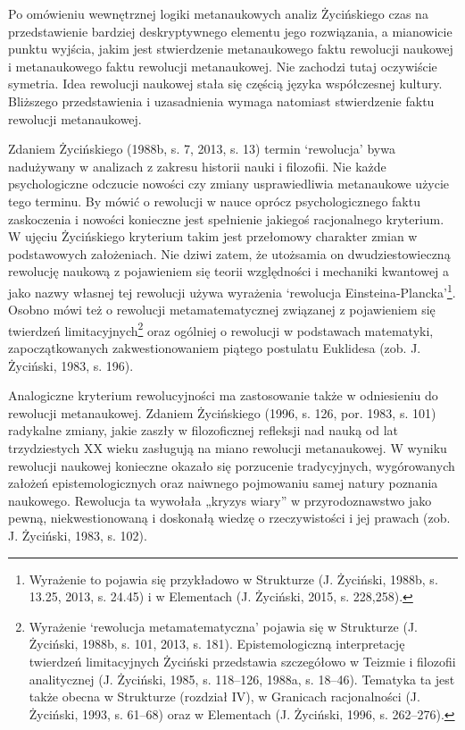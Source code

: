 \documentclass{article}
\begin{document}
Po omówieniu wewnętrznej logiki metanaukowych analiz Życińskiego czas na przedstawienie bardziej deskryptywnego elementu
jego rozwiązania, a mianowicie punktu wyjścia, jakim jest stwierdzenie metanaukowego faktu rewolucji naukowej i
metanaukowego faktu rewolucji metanaukowej. Nie zachodzi tutaj oczywiście symetria. Idea rewolucji naukowej stała się
częścią języka współczesnej kultury. Bliższego przedstawienia i uzasadnienia wymaga natomiast stwierdzenie faktu
rewolucji metanaukowej. 

Zdaniem Życińskiego \label{ref:RNDm1e4fQpTDw}(1988b, s. 7, 2013, s. 13) termin ‘rewolucja’ bywa nadużywany w analizach z
zakresu historii nauki i filozofii. Nie każde psychologiczne odczucie nowości czy zmiany usprawiedliwia metanaukowe
użycie tego terminu. By mówić o rewolucji w nauce oprócz psychologicznego faktu zaskoczenia i nowości konieczne jest
spełnienie jakiegoś racjonalnego kryterium. W ujęciu Życińskiego kryterium takim jest przełomowy charakter zmian w
podstawowych założeniach. Nie dziwi zatem, że utożsamia on dwudziestowieczną rewolucję naukową z pojawieniem się teorii
względności i mechaniki kwantowej a jako nazwy własnej tej rewolucji używa wyrażenia ‘rewolucja
Einsteina-Plancka’\footnote{Wyrażenie to pojawia się przykładowo w Strukturze \label{ref:RNDnNQlvKNfJU}(J. Życiński,
1988b, s. 13.25, 2013, s. 24.45) i w Elementach \label{ref:RNDwUSTjxSagp}(J. Życiński, 2015, s. 228,258).}. Osobno mówi
też o rewolucji metamatematycznej związanej z pojawieniem się twierdzeń limitacyjnych\footnote{Wyrażenie ‘rewolucja
metamatematyczna’ pojawia się w Strukturze  \label{ref:RND06p9KBsVwr}(J. Życiński, 1988b, s. 101, 2013, s. 181).
Epistemologiczną interpretację twierdzeń limitacyjnych Życiński przedstawia szczegółowo w Teizmie i filozofii
analitycznej \label{ref:RNDromKVdEplH}(J. Życiński, 1985, s. 118–126, 1988a, s. 18–46). Tematyka ta jest także obecna w
Strukturze (rozdział IV), w Granicach racjonalności \label{ref:RNDVhjIsTMBSi}(J. Życiński, 1993, s. 61–68) oraz w
Elementach \label{ref:RNDoBnYdXZe0T}(J. Życiński, 1996, s. 262–276).} oraz ogólniej o rewolucji w podstawach
matematyki, zapoczątkowanych zakwestionowaniem piątego postulatu Euklidesa \label{ref:RNDjSFh4bpxsh}(zob. J. Życiński,
1983, s. 196).

Analogiczne kryterium rewolucyjności ma zastosowanie także w odniesieniu do rewolucji metanaukowej. Zdaniem Życińskiego
\label{ref:RND9iw6GUDcsc}(1996, s. 126, por. 1983, s. 101) radykalne zmiany, jakie zaszły w filozoficznej refleksji nad
nauką od lat trzydziestych XX wieku zasługują na miano rewolucji metanaukowej. W wyniku rewolucji naukowej konieczne
okazało się porzucenie tradycyjnych, wygórowanych założeń epistemologicznych oraz naiwnego pojmowaniu samej natury
poznania naukowego. Rewolucja ta wywołała „kryzys wiary” w przyrodoznawstwo jako pewną, niekwestionowaną i doskonałą
wiedzę o rzeczywistości i jej prawach \label{ref:RNDbGHN8nMTuu}(zob. J. Życiński, 1983, s. 102).
\end{document}
